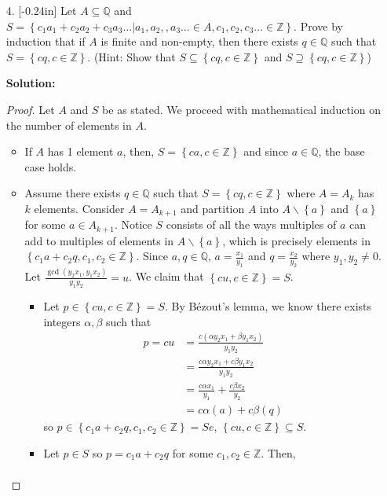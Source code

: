 \documentclass[letterpaper,12pt]{article}
\newcommand{\set}[1]{\left\{ #1 \right\}}
\theoremstyle{definition}
\begin{document}
\pagebreak
\begin{enumerate}
    \item[4.]\reversemarginpar{}[-0.24in] 
  Let $A\subseteq \mathbb{Q}$ and $S = \set{c_1a_1 + c_2a_2 + c_3a_3 \ldots | a_1,a_2,,a_3\ldots \in A, c_1,c_2,c_3 \ldots \in \mathbb{Z}}$. Prove by induction that if $A$ is finite and non-empty, then there exists $q \in \mathbb{Q}$ such that $S = \set{cq, c \in \mathbb{Z}}$. (Hint: Show that $S \subseteq \set{cq, c \in \mathbb{Z}}$ and $S \supseteq \set{cq, c \in \mathbb{Z}}$)
  \begin{mdframed}
  \textbf{Solution:}
      \begin{proof}
          Let $A$ and $S$ be as stated. We proceed with mathematical induction on the number of elements in $A$. \begin{itemize}
        \item If $A$ has 1 element $a$, then, $S = \set{ca, c \in \mathbb{Z}}$ and since $a \in \mathbb{Q}$, the base case holds.
        \item Assume there exists $q \in \mathbb{Q}$ such that $S = \set{cq, c \in \mathbb{Z}}$ where $A=A_{k}$ has $k$ elements. Consider $A=A_{k+1}$ and partition $A$ into $A\backslash \set{a}$ and $\set{a}$ for some $a \in A_{k+1}$. Notice $S$ consists of all the ways multiples of $a$ can add to multiples of elements in $ A\backslash \set{a}$, which is precisely elements in $\set{c_1 a + c_2 q, c_1,c_2 \in \mathbb{Z}}$. Since $a,q \in \mathbb{Q}$, $a = \frac{x_1}{y_1}$ and $q = \frac{x_2}{y_2}$ where $y_1,y_2 \neq 0$. Let $\frac{\gcd (y_2x_1,y_1x_2)}{y_1y_2} = u$. We claim that $\set{ cu, c \in \mathbb{Z} } = S$. \begin{itemize}
            \item Let $p \in \set{ cu, c \in \mathbb{Z} } = S$. By Bézout's lemma, we know there exists integers $\alpha,\beta$ such that \begin{align*}
                p = cu &= \frac{c( \alpha y_2x_1 + \beta y_1x_2)}{y_1y_2} \\
                &= \frac{c\alpha y_2x_1 + c\beta y_1x_2}{y_1y_2} \\
                &= \frac{c\alpha x_1}{y_1} + \frac{c\beta x_2}{y_2} \\
                &= c\alpha(a) + c\beta(q)
            \end{align*}
            so $p \in \set{c_1 a + c_2 q, c_1,c_2 \in \mathbb{Z}} = Se$, $\set{ cu, c \in \mathbb{Z} } \subseteq S$.
            \item Let $p \in S$ so $p = c_1a + c_2 q$ for some $c_1, c_2 \in \mathbb{Z}$. Then, \begin{align*}

\end{align*}
\end{itemize}
\end{itemize}
\end{proof}
\end{mdframed}
\end{enumerate}
\end{document}
